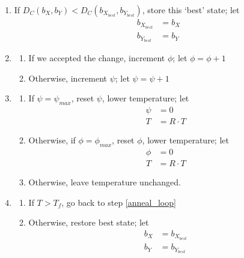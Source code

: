 \begin{enumerate}
\begin{enumerate}
    \end{enumerate}
    \item If $D_C(b_X, b_Y) < D_C(b_{X_{best}}, b_{Y_{best}})$, store this `best' state; let
    \begin{align}
        b_{X_{best}}&=b_X\\
        b_{Y_{best}}&=b_Y
    \end{align}
    \item
    \begin{enumerate}
        \item If we accepted the change, increment $\phi$; let $\phi=\phi+1$
        \item Otherwise, increment $\psi$; let $\psi=\psi+1$
    \end{enumerate}
    \item
    \begin{enumerate}
        \item If $\psi=\psi_{max}$, reset $\psi$, lower temperature; let
        \begin{align}
            \psi &= 0\\
            T &= R\cdot T
        \end{align}
        \item Otherwise, if $\phi=\phi_{max}$, reset $\phi$, lower temperature; let
        \begin{align}
            \phi &= 0\\
            T &= R\cdot T
        \end{align}
        \item Otherwise, leave temperature unchanged.
    \end{enumerate}
    \item 
    \begin{enumerate}
        \item If $T > T_f$, go back to step \ref{anneal_loop}
        \item Otherwise, restore best state; let
        \begin{align}
            b_X&=b_{X_{best}}\\
            b_Y&=b_{Y_{best}}
        \end{align}
    \end{enumerate}
\end{enumerate}
